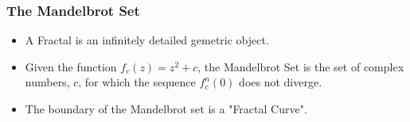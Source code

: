 \documentclass{beamer}
\begin{document}
\begin{frame}
\frametitle{The Mandelbrot Set}
\begin{itemize}
\item A Fractal is an infinitely detailed gemetric object.
\pause
\item Given the function $f_c(z) = z^2 + c$, the Mandelbrot Set is the set of complex numbers, $c$, for which the sequence $f^n_c(0)$ does not diverge.
\pause
\item The boundary of the Mandelbrot set is a "Fractal Curve".
\end{itemize}
\end{frame}
\end{document}
